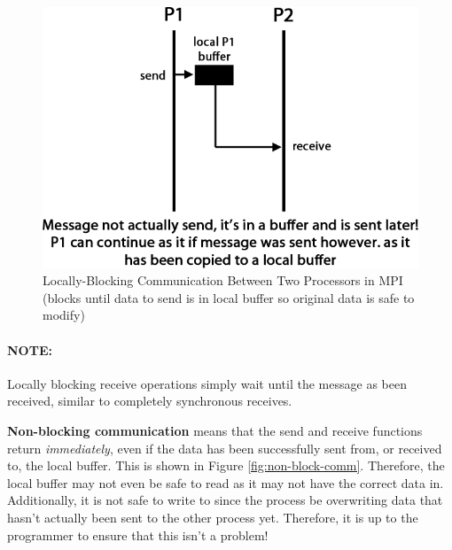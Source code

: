 \documentclass{article}
\begin{document}
\begin{figure}
	\centering
	\includegraphics[scale=0.35]{figures/mpi-local-buffer.png}
	\caption{Locally-Blocking Communication Between Two Processors in MPI (blocks until data to send is in local buffer so original data is safe to modify)}
	\label{fig:local-comm-buffer}
\end{figure}

\paragraph{\textbf{NOTE:}} Locally blocking receive operations simply wait until the message as been received, similar to completely synchronous receives.

\textbf{Non-blocking communication} means that the send and receive functions return \textit{immediately}, even if the data has been successfully sent from, or received to, the local buffer. This is shown in Figure \ref{fig:non-block-comm}. Therefore, the local buffer may not even be safe to read as it may not have the correct data in. Additionally, it is not safe to write to since the process be overwriting data that hasn't actually been sent to the other process yet. Therefore, it is up to the programmer to ensure that this isn't a problem!
\end{document}
